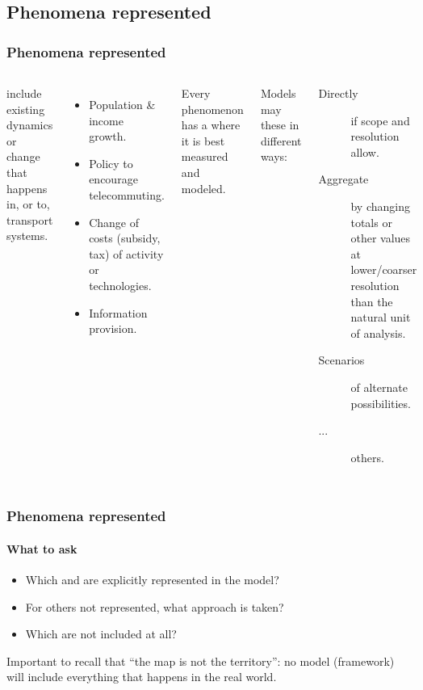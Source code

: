 \documentclass[12pt,aspectratio=169]{beamer}
\begin{document}
\subsection{Phenomena represented}
\begin{frame}
\frametitle{Phenomena represented}

\begin{columns}[T]
 include existing dynamics or change that happens in, or to, transport systems.
\begin{itemize}
  \item Population \& income growth.
  \item Policy to encourage telecommuting.
  \item Change of costs (subsidy, tax) of activity or technologies.
  \item Information provision.
\end{itemize}

\medskip
Every phenomenon has a  where it is best measured and modeled.

Models may  these in different ways:
\begin{description}
  \item [Directly] if scope and resolution allow.
  \item [Aggregate] by changing totals or other values at lower/coarser resolution than the natural unit of analysis.
  \item [Scenarios] of alternate possibilities.
  \item [...] others.
\end{description}

\end{columns}

\end{frame}

\begin{frame}
\frametitle{Phenomena represented}
\framesubtitle{What to ask}

\begin{itemize}
  \item Which  and  are explicitly represented in the model?
  \item For others not represented, what approach is taken?
  \item Which are not included at all?
\end{itemize}

\bigskip
Important to recall that “the map is not the territory”: no model (framework) will include everything that happens in the real world.

\end{frame}
\end{document}
